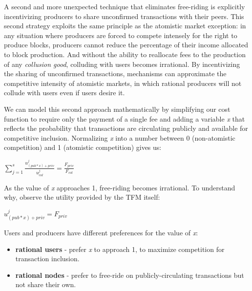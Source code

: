 \documentclass[oneside]{article}   	%
\begin{document}
A second and more unexpected technique that eliminates free-riding is explicitly incentivizing producers to share unconfirmed transactions with their peers. This second strategy exploits the same principle as the atomistic market exception: in any situation where producers are forced to compete intensely for the right to produce blocks, producers cannot reduce the percentage of their income allocated to block production. And without the ability to reallocate fees to the production of any \textit{collusion good}, colluding with users becomes irrational. By incentivizing the sharing of unconfirmed transactions, mechanisms can approximate the competitive intensity of atomistic markets, in which rational producers will not collude with users even if users desire it.

We can model this second approach mathematically by simplifying our cost function to require only the payment of a single fee and adding a variable \textit{x} that reflects the probability that transactions are circulating publicly and available for competitive inclusion. Normalizing \textit{x} into a number between 0 (non-atomistic competition) and 1 (atomistic competition) gives us:

\LARGE
\begin{adjustwidth}{1.5em}{1.5em}
\begin{math}
\sum_{j=1}^{s} \frac{u_{({pub}*{x})+{priv}}^j}{u_{col}^j} = \frac{F_{{priv}}}{F_{col}}
\end{math}
\end{adjustwidth}
\normalsize

As the value of \textit{x} approaches 1, free-riding becomes irrational. To understand why, observe the utility provided by the TFM itself:

\LARGE
\begin{adjustwidth}{1.5em}{1.5em}
\begin{math}
u_{\left({pub}*{x}\right)+{priv}}^j = F_{priv}
\end{math}
\end{adjustwidth}
\normalsize

Users and producers have different preferences for the value of \textit{x}:

\begin{itemize}
  \item \textbf{rational users} - prefer \textit{x} to approach 1, to maximize competition for transaction inclusion.
  \item \textbf{rational nodes} - prefer to free-ride on publicly-circulating transactions but not share their own.
\end{itemize}
\end{document}
